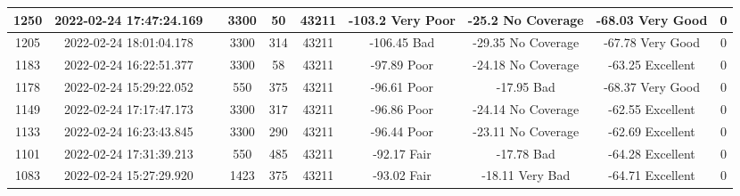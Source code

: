 \begin{longtable*}{|c|c|c|c|c|c|c|c|c|c|}
1250&2022-02-24 17:47:24.169&&3300&50&43211& -103.2    Very Poor   & -25.2     No Coverage & -68.03    Very Good   & 0\\\hline
{}1205&2022-02-24 18:01:04.178&&3300&314&43211& -106.45   Bad         & -29.35    No Coverage & -67.78    Very Good   & 0\\\hline
{}1183&2022-02-24 16:22:51.377&&3300&58&43211& -97.89    Poor        & -24.18    No Coverage & -63.25    Excellent   & 0\\\hline
{}1178&2022-02-24 15:29:22.052&&550&375&43211& -96.61    Poor        & -17.95    Bad         & -68.37    Very Good   & 0\\\hline
{}1149&2022-02-24 17:17:47.173&&3300&317&43211& -96.86    Poor        & -24.14    No Coverage & -62.55    Excellent   & 0\\\hline
{}1133&2022-02-24 16:23:43.845&&3300&290&43211& -96.44    Poor        & -23.11    No Coverage & -62.69    Excellent   & 0\\\hline
{}1101&2022-02-24 17:31:39.213&&550&485&43211& -92.17    Fair        & -17.78    Bad         & -64.28    Excellent   & 0\\\hline
{}1083&2022-02-24 15:27:29.920&&1423&375&43211& -93.02    Fair        & -18.11    Very Bad    & -64.71    Excellent   & 0\\\hline

\end{longtable*}

